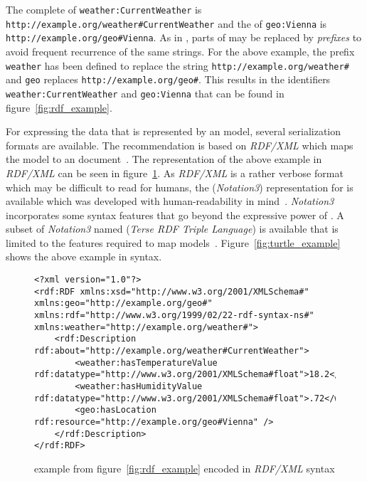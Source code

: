 The complete  of \texttt{weather:CurrentWeather} is \texttt{http://example.org/weather\#CurrentWeather} and the  of \texttt{geo:Vienna} is \texttt{http://example.org/geo\#Vienna}. As in , parts of  may be replaced by \emph{prefixes} to avoid frequent recurrence of the same strings. For the above example, the prefix \texttt{weather} has been defined to replace the string \texttt{http://example.org/weather\#} and \texttt{geo} replaces \texttt{http://example.org/geo\#}. This results in the identifiers \texttt{weather:CurrentWeather} and \texttt{geo:Vienna} that can be found in figure~\ref{fig:rdf_example}.

For expressing the data that is represented by an  model, several serialization formats are available. The  recommendation is based on \emph{RDF/XML} which maps the  model to an  document~\cite{RDF_XML}. The representation of the above example in \emph{RDF/XML} can be seen in figure~\ref{fig:rdfxml_example}. As \emph{RDF/XML} is a rather verbose format which may be difficult to read for humans, the  (\emph{Notation3}) representation for  is available which was developed with human-readability in mind~\cite{Notation3}. \emph{Notation3} incorporates some syntax features that go beyond the expressive power of . A subset of \emph{Notation3} named  (\emph{Terse RDF Triple Language}) is available that is limited to the features required to map  models~\cite{Turtle}. Figure~\ref{fig:turtle_example} shows the above example in  syntax.

\begin{figure} %
\begin{lstlisting}
<?xml version="1.0"?>
<rdf:RDF xmlns:xsd="http://www.w3.org/2001/XMLSchema#" xmlns:geo="http://example.org/geo#" xmlns:rdf="http://www.w3.org/1999/02/22-rdf-syntax-ns#" xmlns:weather="http://example.org/weather#">
	<rdf:Description rdf:about="http://example.org/weather#CurrentWeather">
		<weather:hasTemperatureValue rdf:datatype="http://www.w3.org/2001/XMLSchema#float">18.2</weather:hasTemperatureValue>
		<weather:hasHumidityValue rdf:datatype="http://www.w3.org/2001/XMLSchema#float">.72</weather:hasHumidityValue>
		<geo:hasLocation rdf:resource="http://example.org/geo#Vienna" />
	</rdf:Description>
</rdf:RDF>
\end{lstlisting}
\caption{ example from figure~\ref{fig:rdf_example} encoded in \emph{RDF/XML} syntax}
\label{fig:rdfxml_example}
\end{figure}

